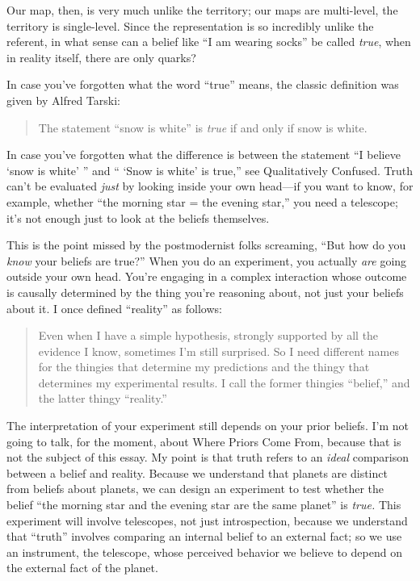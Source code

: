 {
 Our map, then, is very much unlike the territory; our maps are
multi-level, the territory is single-level. Since the representation is
so incredibly unlike the referent, in what sense can a belief like
``I am wearing socks'' be called
\textit{true}, when in reality itself, there are only quarks?}

{
 In case you've forgotten what the word
``true'' means, the classic
definition was given by Alfred Tarski:}

\begin{quote}
{
 The statement ``snow is white''
 is \textit{true} if and only if snow is white.}
\end{quote}

{
 In case you've forgotten what the difference is
between the statement ``I believe `snow
is white' '' and
`` `Snow is white' is
true,'' see Qualitatively Confused. Truth
can't be evaluated \textit{just} by looking inside your
own head---if you want to know, for example, whether
``the morning star = the evening
star,'' you need a telescope; it's
not enough just to look at the beliefs themselves.}

{
 This is the point missed by the postmodernist folks screaming,
``But how do you \textit{know} your beliefs are
true?'' When you do an experiment, you actually
\textit{are} going outside your own head. You're
engaging in a complex interaction whose outcome is causally determined
by the thing you're reasoning about, not just your
beliefs about it. I once defined
``reality'' as follows:}

\begin{quote}
{
 Even when I have a simple hypothesis, strongly supported by all
the evidence I know, sometimes I'm still surprised. So
I need different names for the thingies that determine my predictions
and the thingy that determines my experimental results. I call the
former thingies ``belief,'' and the
latter thingy ``reality.''}
\end{quote}

{
 The interpretation of your experiment still depends on your prior
beliefs. I'm not going to talk, for the moment, about
Where Priors Come From, because that is not the subject of this essay.
My point is that truth refers to an \textit{ideal} comparison between a
belief and reality. Because we understand that planets are distinct
from beliefs about planets, we can design an experiment to test whether
the belief ``the morning star and the evening star are
the same planet'' is \textit{true.} This experiment
will involve telescopes, not just introspection, because we understand
that ``truth'' involves comparing an
internal belief to an external fact; so we use an instrument, the
telescope, whose perceived behavior we believe to depend on the
external fact of the planet.}

